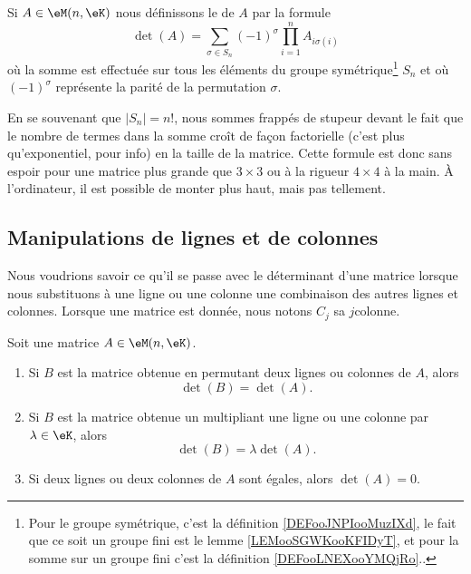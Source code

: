 \begin{definition}      \label{DEFooYCKRooTrajdP}
    Si \( A\in\eM(n,\eK)\) nous définissons le  de \( A\) par la formule
    \begin{equation}
        \det(A)=\sum_{\sigma\in S_n}(-1)^{\sigma}\prod_{i=1}^nA_{i\sigma(i)}
    \end{equation}
    où la somme est effectuée sur tous les éléments du groupe symétrique\footnote{Pour le groupe symétrique, c'est la définition \ref{DEFooJNPIooMuzIXd}, le fait que ce soit un groupe fini est le lemme \ref{LEMooSGWKooKFIDyT}, et pour la somme sur un groupe fini c'est la définition \ref{DEFooLNEXooYMQjRo}..} \( S_n\) et où \( (-1)^{\sigma}\) représente la parité de la permutation \( \sigma\).
\end{definition}
En se souvenant que \( | S_n |=n!\), nous sommes frappés de stupeur devant le fait que le nombre de termes dans la somme croît de façon factorielle (c'est plus qu'exponentiel, pour info) en la taille de la matrice. Cette formule est donc sans espoir pour une matrice plus grande que \( 3\times 3\) ou à la rigueur \( 4\times 4\) à la main. À l'ordinateur, il est possible de monter plus haut, mais pas tellement.

\subsection{Manipulations de lignes et de colonnes}

Nous voudrions savoir ce qu'il se passe avec le déterminant d'une matrice lorsque nous substituons à une ligne ou une colonne une combinaison des autres lignes et colonnes. Lorsque une matrice est donnée, nous notons \( C_j\) sa \( j\)\ieme colonne.

\begin{proposition}
    Soit une matrice \( A\in \eM(n,\eK)\).
    \begin{enumerate}
        \item       \label{ITEMooSOHWooEHJFZD}
            Si \( B\) est la matrice obtenue en permutant deux lignes ou colonnes de \( A\), alors
            \begin{equation}
                \det(B)=\det(A).
            \end{equation}
        \item       \label{ITEMooBKIGooCDQEDt}
            Si \( B\) est la matrice obtenue un multipliant une ligne ou une colonne par \( \lambda\in \eK\), alors
            \begin{equation}
                \det(B)=\lambda \det(A).
            \end{equation}
        \item       \label{ITEMooWBUTooGuGkmN}
            Si deux lignes ou deux colonnes de \( A\) sont égales, alors \( \det(A)=0\).
    \end{enumerate}
\end{proposition}

